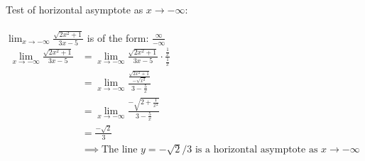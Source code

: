 \documentclass[nooutcomes,handout]{ximera}
\begin{document}
\begin{problem}
\begin{enumerate}
\begin{freeResponse}
        Test of horizontal asymptote as $x \to -\infty$:\\\\
         $\lim_{x \to -\infty} \frac{\sqrt{2x^2 + 1}}{3x-5}$ is of the form: $\frac{\infty}{-\infty}$
        \begin{align*}
          \lim_{x \to -\infty} \frac{\sqrt{2x^2 + 1}}{3x-5}
          &= \lim_{x \to -\infty} \frac{\sqrt{2x^2 + 1}}{3x-5} \cdot \frac{\frac{1}{x}}{\frac{1}{x}} \\
          &= \lim_{x \to -\infty}  \frac{\frac{\sqrt{2x^2 + 1}}{-\sqrt{x^2}}}{3 - \frac{5}{x}}\\
          &= \lim_{x \to -\infty}  \frac{-\sqrt{2 + \frac{1}{x^2}}}{3 - \frac{5}{x}} \\
          &= \frac{-\sqrt{2}}{3} \\
          &\implies \mbox{The line $y = -\sqrt{2}/3$ is a horizontal asymptote as $x \to -\infty$}
        \end{align*}
	
      \end{freeResponse}
 \end{enumerate}

    
\end{problem}
\end{document}
